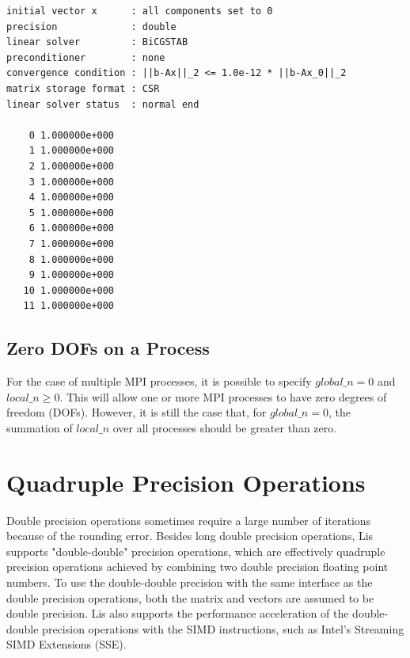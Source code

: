 \documentclass[a4paper]{article}
\begin{document}
\begin{verbatim}
initial vector x      : all components set to 0
precision             : double
linear solver         : BiCGSTAB
preconditioner        : none
convergence condition : ||b-Ax||_2 <= 1.0e-12 * ||b-Ax_0||_2
matrix storage format : CSR
linear solver status  : normal end

    0 1.000000e+000
    1 1.000000e+000
    2 1.000000e+000
    3 1.000000e+000
    4 1.000000e+000
    5 1.000000e+000
    6 1.000000e+000
    7 1.000000e+000
    8 1.000000e+000
    9 1.000000e+000
   10 1.000000e+000
   11 1.000000e+000
\end{verbatim}

\subsection{Zero DOFs on a Process}
For the case of multiple MPI processes, it is possible to specify
$global\_n = 0$ and $local\_n \ge 0$. This will allow one or more
MPI processes to have zero degrees of freedom (DOFs).
However, it is still the case that,
for $global\_n = 0$, the summation of $local\_n$ over all processes
should be greater than zero. 

\newpage
\section{Quadruple Precision Operations}
\label{sec:quadruple}
\indent
Double precision operations sometimes require a large number of iterations 
because of the rounding error. Besides long double precision operations,
Lis supports "double-double" precision operations, 
which are effectively quadruple precision operations
achieved by combining 
two double precision floating point numbers\cite{dd,qd}.
To use the double-double precision with the same interface 
as the double precision operations, 
both the matrix and vectors are assumed to be double precision. 
Lis also supports the performance acceleration of the double-double precision
operations with the SIMD instructions, such as
Intel's Streaming SIMD Extensions (SSE)\cite{quadlis}. 
\end{document}
